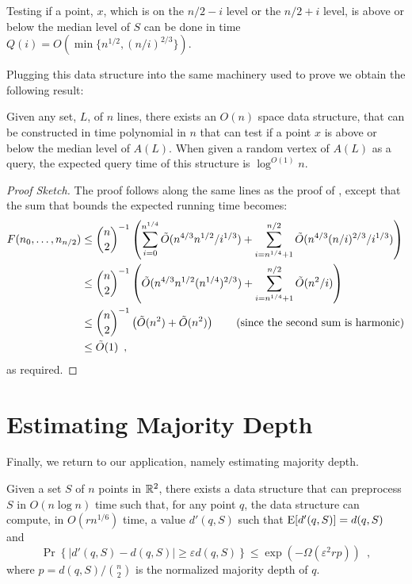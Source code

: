 \documentclass{patmorin}
\newcommand{\eps}{\varepsilon}
\begin{document}
\begin{lem}
  Testing if a point, $x$, which is on the $n/2-i$ level or the $n/2+i$
  level, is above or below the median level of $S$ can be done in time
  $Q(i) = O(\min\{n^{1/2},(n/i)^{2/3}\})$.
\end{lem}

Plugging this data structure into the same machinery used to prove
 we obtain the following result:

\begin{thm}
  Given any set, $L$, of $n$ lines, there exists an $O(n)$ space data
  structure, that can be constructed in time polynomial in $n$ that can test
  if a point $x$ is above or below the median level of $A(L)$.  When given
  a random vertex of $A(L)$ as a query, the expected query time of this
  structure is $\log^{O(1)} n$.
\end{thm}

\begin{proof}[Proof Sketch]
  The proof follows along the same lines as the proof of
  , except that the sum that bounds the expected
  running time becomes:
  \begin{align*}
     F(n_0,\ldots,n_{n/2})
       & \le \binom{n}{2}^{-1}\left(\sum_{i=0}^{n^{1/4}}\tilde{O}(n^{4/3}n^{1/2}/i^{1/3})
      + \sum_{i=n^{1/4}+1}^{n/2}\tilde{O}(n^{4/3}(n/i)^{2/3}/i^{1/3}) \right) \\
     & \le \binom{n}{2}^{-1}\left(\tilde{O}(n^{4/3}n^{1/2}(n^{1/4})^{2/3})
      + \sum_{i=n^{1/4}+1}^{n/2}\tilde{O}(n^{2}/i) \right) \\
     & \le \binom{n}{2}^{-1}\left(\tilde{O}(n^2) + \tilde{O}(n^{2}) \right) 
       \qquad \text{(since the second sum is harmonic)} \\
     & \le \tilde{O}(1) \enspace ,
  \end{align*}
  as required.
\end{proof}


\section{Estimating Majority Depth}

Finally, we return to our application, namely estimating majority depth. 

\begin{thm}
  Given a set $S$ of $n$ points in $\mathbb{R}^2$, there exists a data structure
  that can preprocess $S$ in $O(n\log n)$ time such that, for any point
  $q$, the data structure can compute, in $O(rn^{1/6})$ time, a value
  $d'(q,S)$ such that $\mathrm{E}[d'(q,S)]=d(q,S)$ and
  \[
     \Pr\left\{|d'(q,S)-d(q,S)| \ge \eps d(q,S)\right\} 
        \le \exp\left(-\Omega\left(\eps^2rp\right)\right) \enspace ,
  \]
  where $p=d(q,S)/\binom{n}{2}$ is the normalized majority depth of $q$.
\end{thm}
\end{document}
